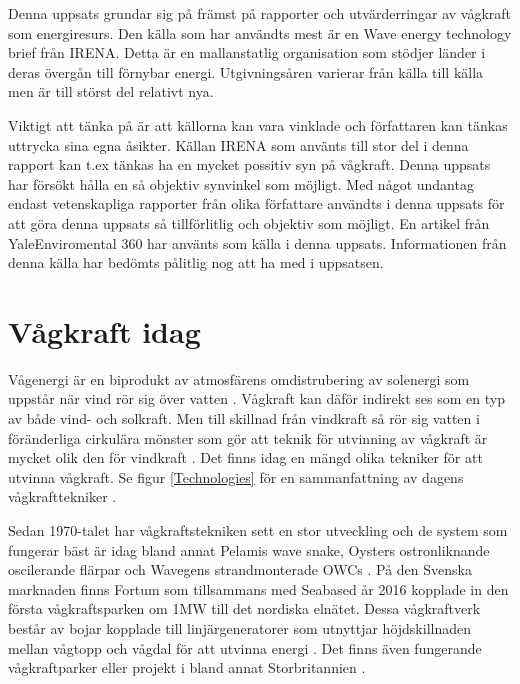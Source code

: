 \documentclass[10pt,a4paper,oneside]{article}
\begin{document}
Denna uppsats grundar sig på främst på rapporter och utvärderringar av vågkraft som energiresurs. Den källa som har användts mest är en Wave energy technology brief från IRENA. Detta är en mallanstatlig organisation som stödjer länder i deras övergån till förnybar energi. Utgivningsåren varierar från källa till källa men är till störst del relativt nya.

Viktigt att tänka på är att källorna kan vara vinklade och författaren kan tänkas uttrycka sina egna åsikter. Källan IRENA som använts till stor del i denna rapport kan t.ex tänkas ha en mycket possitiv syn på vågkraft. Denna uppsats har försökt hålla en så objektiv synvinkel som möjligt.  Med något undantag endast vetenskapliga rapporter från olika författare användts i denna uppsats för att göra denna uppsats så tillförlitlig och objektiv som möjligt. En artikel från YaleEnviromental 360 har använts som källa i denna uppsats. Informationen från denna källa har bedömts pålitlig nog att ha med i uppsatsen.\newpage



\section{Vågkraft idag}
Vågenergi är en biprodukt av atmosfärens omdistrubering av solenergi som uppstår när vind rör sig över vatten \cite{Cruz}. Vågkraft kan däför indirekt ses som en typ av både vind- och solkraft. Men till skillnad från vindkraft så rör sig vatten i föränderliga cirkulära mönster som gör att teknik för utvinning av vågkraft är mycket olik den för vindkraft \cite{Elliott}. Det finns idag en mängd olika tekniker för att utvinna vågkraft. Se figur \ref{Technologies} för en sammanfattning av dagens vågkrafttekniker \cite{IRENA}.

Sedan 1970-talet har vågkraftstekniken sett en stor utveckling och de system som fungerar bäst är idag bland annat Pelamis wave snake, Oysters ostronliknande oscilerande flärpar och Wavegens strandmonterade  OWCs \cite{Elliott}. På den Svenska marknaden finns Fortum som tillsammans med Seabased år 2016 kopplade in den första vågkraftsparken om 1MW till det nordiska elnätet. Dessa vågkraftverk består av bojar kopplade till linjärgeneratorer som utnyttjar höjdskillnaden mellan vågtopp och vågdal för att utvinna energi \cite{Fortum}. Det finns även fungerande vågkraftparker eller projekt i bland annat Storbritannien \cite{Yale}.  
\end{document}
